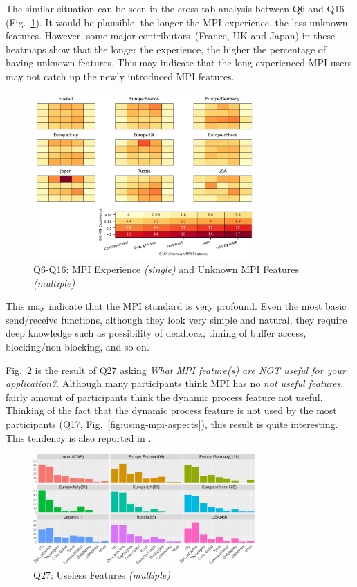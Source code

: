 \documentclass[preprint,5p,times]{elsarticle}
\def\myquote#1{{\it #1}}
\def\mcountries{major contributors}%
\begin{document}
The similar situation can be seen in the cross-tab analysis between Q6
and Q16 (Fig.~\ref{fig:experience-and-aspects}). It would be plausible,
the longer the MPI experience, the less unknown features. However,
some \mcountries\  (France, UK and Japan) in these heatmaps show that the
longer the experience, the higher the percentage of having unknown
features. This may indicate that the long experienced MPI users may
not catch up the newly introduced MPI features.

\begin{figure}[htb]
  \begin{center}
    \includegraphics[width=8.5cm]{Figs/Q6-Q16.pdf}
    \caption{Q6-Q16: MPI Experience {\it(single)} and Unknown MPI Features {\it(multiple)}}
    \label{fig:experience-and-aspects}
  \end{center}
\end{figure}

This may indicate
that the MPI standard is very profound. Even the most basic
send/receive functions, although they look very simple and natural,
they require deep knowledge such as possibility of deadlock, timing of
buffer access, blocking/non-blocking, and so on.

Fig.~\ref{fig:useless-features} is the result of Q27 asking \myquote{What MPI
feature(s) are NOT useful for your application?}. Although many
participants think MPI has no {\it not useful features}, fairly amount of
participants think the dynamic process feature not useful. Thinking
of the fact that the dynamic process feature is not used by the most
participants (Q17, Fig.~\ref{fig:using-mpi-aspects}), this result is
quite interesting.
This tendency is also reported in \cite{10.1145/3295500.3356176}.

\begin{figure}[htb]
  \begin{center}
    \includegraphics[width=8.5cm]{R-scripts/Q27.pdf}
    \caption{Q27: Useless Features {\it(multiple)}}
    \label{fig:useless-features}
  \end{center}
\end{figure}
\end{document}
